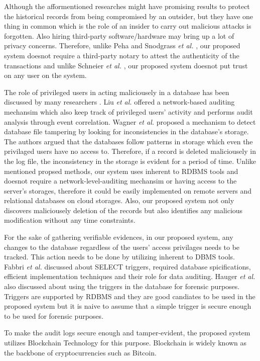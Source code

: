 Although the afformentioned researches might have promising results to protect the historical records from being compromised by an outsider, but they have one thing in common which is the role of an insider to carry out malicious attacks is forgotten. Also hiring third-party software/hardware may bring up a lot of privacy concerns. Therefore, unlike Peha \cite{peha1999electronic} and Snodgrass {\it et al.} \cite{snodgrass2004Tamper}, our proposed system doesnot require a third-party notary to attest the authenticity of the transactions and unlike Schneier {\it et al.} \cite{schneier1998cryptoraphic}, our proposed system doesnot put trust on any user on the system.

The role of privileged users in acting maliciousely in a database has been discussed by many researchers \cite{crosby2009tamper-evident} \cite{wagner2018detect}. Liu {\it et al.} offered a network-based auditing mechansim which also keep track of privileged users' activity and performs audit analysis through event correlation. Wagner {\it et al.} \cite{wanger2017carving} proposed a mechanism to detect database file tampering by looking for inconsistencies in the database's storage. The authors argued that the databases follow patterns in storage which even the privilaged users have no access to. Therefore, if a record is deleted maliciousely in the log file, the inconsistency in the storage is evident for a period of time. Unlike mentioned propsed methods, our system uses inherent to RDBMS tools and doesnot require a network-level-auditing mechansim or having access to the server's storages, therefore it could be easily implemented on remote servers and relational databases on cloud storages. Also, our proposed system not only discovers maliciousely deletion of the records but also identifies any malicious modification without any time constraints.

For the sake of gathering verifiable evidences, in our proposed system, any changes to the database regardless of the users' access privilages needs to be tracked. This action needs to be done by utilizing inherent to DBMS tools. Fabbri {\it et al.} \cite{fabbri2013select} discussed about SELECT triggers, required database spicifications, efficient implementation techniques and their role for data auditing. Hauger {\it et al.}\cite{hauger2014information} also discussed about using the triggers in the database for forensic purposes. Triggers are supported by RDBMS and they are good candiates to be used in the proposed system but it is naive to assume that a simple trigger is secure enough to be used for forensic purposes.

To make the audit logs secure enough and tamper-evident, the proposed system utilizes Blockchain Technology for this purpose. Blockchain is widely known as the backbone of cryptocurrencies such as Bitcoin. \cite{nakamoto2008bitcoin}